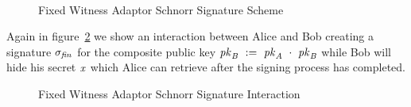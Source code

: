 \begin{figure}
{{{                \pcreturn \procFinSig{\varSigAlice}{\varSigAptBob}{\varRandAlice}{\varRandBob}
            } \\[2\baselineskip]
            \procedure[linenumbering, syntaxhighlight=auto]{$\procExtWit{\varSigFin}{\varSigAlice}{\varSigAptBob}$}{
                \varSigBob \opAssign \varSigFin \opSub \varSigAlice \\
                \varWit \opAssign \varSigAptBob \opSub \varSigBob \\
                \pcreturn (\varWit)
            }
        }
    }
    \caption{Fixed Witness Adaptor Schnorr Signature Scheme}
    \label{fig:aptSchnorr}
\end{figure}

Again in figure~\ref{fig:aptSchnorrInteraction} we show an interaction between Alice and Bob creating a signature $\sigma_{\mathit{fin}}$ for the composite public key $\mathit{pk}_{\mathit{B}} ~:=~ \mathit{pk}_{\mathit{A}} ~\cdot~ \mathit{pk}_{\mathit{B}}$
while Bob will hide his secret $\mathit{x}$ which Alice can retrieve after the signing process has completed.

\begin{figure}
    \caption{Fixed Witness Adaptor Schnorr Signature Interaction}
    \label{fig:aptSchnorrInteraction}
\end{figure}


